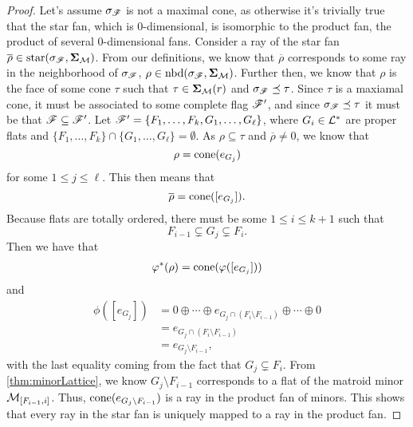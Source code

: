 \documentclass[12pt,oneside]{../../sfsuthesis}
\begin{document}
\begin{proof}
    Let's assume \( \sigma_{\mathscr{F}} \) is not a maximal cone, as otherwise it's trivially true that the star fan, which is 0-dimensional, is isomorphic to the product fan, the product of several 0-dimensional fans.
    Consider a ray of the star fan \( \overline{\rho} \in \operatorname{star}(\sigma_{\mathscr{F}}, \bm{\Sigma}_{\mathcal{M}}) \).
    From our definitions, we know that \( \overline{\rho} \) corresponds to some ray in the neighborhood of \( \sigma_{\mathscr{F}} \), \( \rho \in \operatorname{nbd}(\sigma_{\mathscr{F}}, \bm{\Sigma}_{\mathcal{M}}) \).
    Further then, we know that \( \rho \) is the face of some cone \( \tau \) such that \( \tau \in \bm{\Sigma}_{\mathcal{M}}(r) \) and \( \sigma_{\mathscr{F}} \preceq \tau \).
    Since \( \tau \) is a maxiamal cone, it must be associated to some complete flag \( \mathscr{F}' \), and since \( \sigma_{\mathscr{F}} \preceq \tau \) it must be that \( \mathscr{F} \subseteq \mathscr{F}' \).
    Let \( \mathscr{F}' = \{ F_1, \dots, F_k, G_1, \dots, G_\ell \} \), where \( G_i \in \mathcal{L}^\ast \) are proper flats and \( \{ F_1, \dots, F_k \} \cap \{ G_1, \dots, G_\ell \} = \emptyset \).
    As \( \rho \subseteq \tau \) and \( \overline{\rho} \neq 0\), we know that
    \[
        \rho = \mathrm{cone}( e_{G_{j}} )
    \]
    for some \( 1 \leq j \leq \ell \).
    This then means that
    \[
        \overline{\rho} = \mathrm{cone}([e_{G_{j}}]).
    \]
    Because flats are totally ordered, there must be some {\( 1 \leq i \leq k+1 \)} such that
    \[
        F_{i-1} \subsetneq G_j \subsetneq F_{i}.
    \]
    Then we have that
    \begin{align*}
        \varphi^\ast(\rho) = \mathrm{cone}(\varphi([e_{G_j}]))
    \end{align*}
    and
    \begin{align*}
        \phi([e_{G_j}]) & = 0 \oplus \cdots \oplus e_{G_j \cap (F_i \setminus F_{i-1})} \oplus \cdots \oplus 0 \\
                        & = e_{G_j \cap (F_i \setminus F_{i-1})}                                               \\
                        & = e_{G_j \setminus F_{i-1}},
    \end{align*}
    with the last equality coming from the fact that \( G_j \subsetneq F_i \).
    From \th\ref{thm:minorLattice}, we know \( G_j \setminus F_{i-1} \) corresponds to a flat of the matroid minor \( \mathcal{M}_{[F_{i-1}, i]} \).
    Thus,  \( \mathrm{cone}(e_{G_j \setminus F_{i-1}}) \) is a ray in the product fan of minors.
    This shows that every ray in the star fan is uniquely mapped to a ray in the product fan.


\end{proof}
\end{document}
